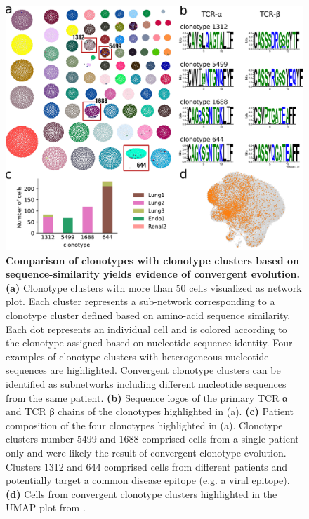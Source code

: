 \documentclass{article}
\begin{document}
\newpage
\begin{figure}[H]
  \centering
  \includegraphics[width=7in]{../figures/clonotype_convergence.pdf}
  \caption{\textbf{Comparison of clonotypes with clonotype clusters based on sequence-similarity yields evidence of convergent evolution.} \textbf{(a)} Clonotype clusters with more than 50 cells visualized as network plot. Each cluster represents a sub-network corresponding to a clonotype cluster defined based on amino-acid sequence similarity. Each dot represents an individual cell and is colored according to the clonotype assigned based on nucleotide-sequence identity. Four examples of clonotype clusters with heterogeneous nucleotide sequences are highlighted. Convergent clonotype clusters can be identified as subnetworks including different nucleotide sequences from the same patient. \textbf{(b)} Sequence logos of the primary TCR α and TCR β chains of the clonotypes highlighted in (a). \textbf{(c)} Patient composition of the four clonotypes highlighted in (a). Clonotype clusters number 5499 and 1688 comprised cells from a single patient only and were likely the result of convergent clonotype evolution. Clusters 1312 and 644 comprised cells from different patients and potentially target a common disease epitope (e.g. a viral epitope). \textbf{(d)} Cells from convergent clonotype clusters highlighted in the UMAP plot from \textcite{Wu2020-vp}. }
\end{figure}
\end{document}
